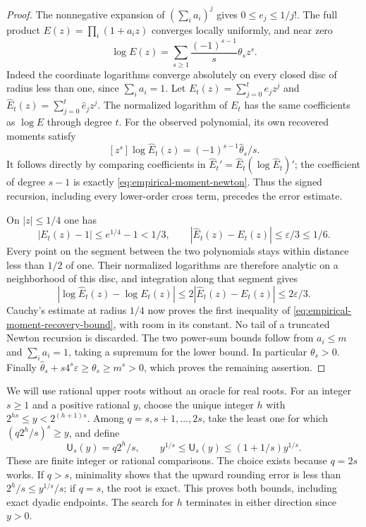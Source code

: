\documentclass[11pt]{article}
\theoremstyle{definition}
\begin{document}
\begin{proof}
The nonnegative expansion of $(\sum_i a_i)^j$ gives
$0\le e_j\le1/j!$.
The full product $E(z)=\prod_i(1+a_i z)$ converges locally
uniformly, and near zero
\[
 \log E(z)=\sum_{s\ge1}\frac{(-1)^{s-1}}s\theta_sz^s .
\]
Indeed the coordinate logarithms converge absolutely on every
closed disc of radius less than one, since $\sum_i a_i=1$.
Let $E_t(z)=\sum_{j=0}^te_jz^j$ and
$\widehat E_t(z)=\sum_{j=0}^t\widehat e_jz^j$.
The normalized logarithm of $E_t$ has the same coefficients
as $\log E$ through degree $t$.
For the observed polynomial, its own recovered moments satisfy
\[
 [z^s]\log\widehat E_t(z)
                       =(-1)^{s-1}\widehat\theta_s/s .
\]
It follows directly by comparing coefficients in
$\widehat E_t'=\widehat E_t(\log\widehat E_t)'$;
the coefficient of degree $s-1$ is exactly
\eqref{eq:empirical-moment-newton}.
Thus the signed recursion, including every lower-order cross
term, precedes the error estimate.

On $|z|\le1/4$ one has
\[
 |E_t(z)-1|\le e^{1/4}-1<1/3,\qquad
 |\widehat E_t(z)-E_t(z)|\le\varepsilon/3\le1/6 .
\]
Every point on the segment between the two polynomials stays
within distance less than $1/2$ of one.
Their normalized logarithms are therefore analytic on a
neighborhood of this disc, and integration along that segment gives
\[
 |\log\widehat E_t(z)-\log E_t(z)|
       \le2|\widehat E_t(z)-E_t(z)|
       \le2\varepsilon/3 .
\]
Cauchy's estimate at radius $1/4$ now proves the first inequality
of \eqref{eq:empirical-moment-recovery-bound}, with room in its
constant.  No tail of a truncated Newton recursion is discarded.
The two power-sum bounds follow from $a_i\le m$ and
$\sum_i a_i=1$, taking a supremum for the lower bound.
In particular $\theta_s>0$.
Finally $\widehat\theta_s+s4^s\varepsilon\ge\theta_s\ge m^s>0$,
which proves the remaining assertion.
\end{proof}

We will use rational upper roots without an oracle for real roots.
For an integer $s\ge1$ and a positive rational $y$, choose the
unique integer $h$ with $2^{hs}\le y<2^{(h+1)s}$.
Among $q=s,s+1,\ldots,2s$, take the least one for which
$(q2^h/s)^s\ge y$, and define
\begin{equation}
       \mathsf U_s(y)=q2^h/s,\qquad
       y^{1/s}\le\mathsf U_s(y)
                         \le(1+1/s)y^{1/s}.
 \label{eq:empirical-moment-rational-root}
\end{equation}
These are finite integer or rational comparisons.
The choice exists because $q=2s$ works.
If $q>s$, minimality shows that the upward rounding error
is less than $2^h/s\le y^{1/s}/s$; if $q=s$, the root is
exact.  This proves both bounds, including exact dyadic endpoints.
The search for $h$ terminates in either direction since $y>0$.
\end{document}
